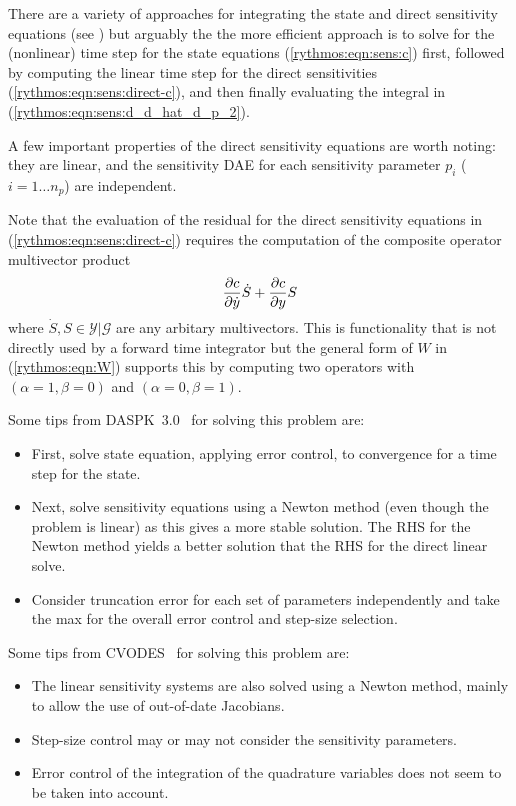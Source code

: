 \documentclass[pdf,ps2pdf,11pt]{SANDreport}
\begin{document}
There are a variety of approaches for integrating the state and direct
sensitivity equations (see {}\cite{cvodes}) but arguably the the more
efficient approach is to solve for the (nonlinear) time step for the state
equations (\ref{rythmos:eqn:sens:c}) first, followed by computing the linear
time step for the direct sensitivities (\ref{rythmos:eqn:sens:direct-c}), and
then finally evaluating the integral in
(\ref{rythmos:eqn:sens:d_d_hat_d_p_2}).

A few important properties of the direct sensitivity equations are worth
noting: they are linear, and the sensitivity DAE for each sensitivity
parameter $p_i$ ($i=1\ldots{}n_p$) are independent.

Note that the evaluation of the residual for the direct sensitivity equations
in (\ref{rythmos:eqn:sens:direct-c}) requires the computation of the composite
operator multivector product
%
\[
\displaystyle{\frac{\partial c}{\partial \dot{y}}} \dot{S} + \displaystyle{\frac{\partial c}{\partial y}} S
\]
%
where $\dot{S}, S {}\in\mathcal{Y}|\mathcal{G}$ are any arbitary multivectors.
This is functionality that is not directly used by a forward time integrator
but the general form of $W$ in (\ref{rythmos:eqn:W}) supports this by
computing two operators with $(\alpha=1,\beta=0)$ and $(\alpha=0,\beta=1)$.

Some tips from DASPK~3.0~\cite{new-daspk} for solving this problem are:
\begin{itemize}
%
{}\item First, solve state equation, applying error control, to convergence for a
time step for the state.
%
{}\item Next, solve sensitivity equations using a Newton method (even though the problem
is linear) as this gives a more stable solution.  The RHS for the Newton method yields
a better solution that the RHS for the direct linear solve.
%
{}\item Consider truncation error for each set of parameters independently and take
the max for the overall error control and step-size selection.
%
\end{itemize}

Some tips from CVODES~\cite{cvodes} for solving this problem are:
\begin{itemize}
%
{}\item The linear sensitivity systems are also solved using a Newton method,
mainly to allow the use of out-of-date Jacobians.
%
{}\item Step-size control may or may not consider the sensitivity parameters.
%
{}\item Error control of the integration of the quadrature variables does
not seem to be taken into account.
%
\end{itemize}
\end{document}
